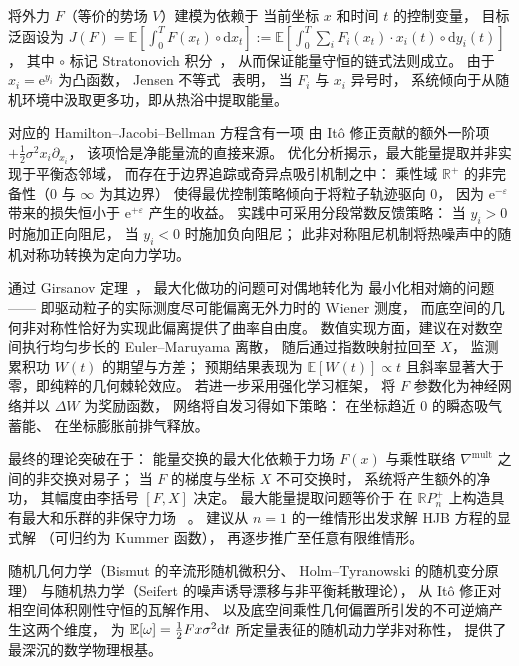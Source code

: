 ﻿\documentclass[10pt,a4paper]{article}
\numberwithin{equation}{section}
\begin{document}
将外力 $F$（等价的势场 $V$）建模为依赖于
当前坐标 $x$ 和时间 $t$ 的控制变量，
目标泛函设为
$J(F) = \mathbb E\left[\int_0^T F(x_t)\circ \mathrm dx_t\right]
:= \mathbb E\left[\int_0^T \sum_i F_i(x_t)\cdot x_i(t)\circ \mathrm dy_i(t)\right]$，
其中 $\circ$ 标记 Stratonovich 积分~\cite{Stratonovich1966New}，
从而保证能量守恒的链式法则成立。
由于 $x_i = \mathrm e^{y_i}$ 为凸函数，
Jensen 不等式~\cite{Jensen1906SurLesFonctions} 表明，
当 $F_i$ 与 $x_i$ 异号时，
系统倾向于从随机环境中汲取更多功，即从热浴中提取能量。

对应的 Hamilton--Jacobi--Bellman 方程含有一项
由 It\^{o} 修正贡献的额外一阶项 $+\frac12\sigma^2 x_i \partial_{x_i}$，
该项恰是净能量流的直接来源。
优化分析揭示，最大能量提取并非实现于平衡态邻域，
而存在于边界追踪或奇异点吸引机制之中：
乘性域 $\mathbb R^+$ 的非完备性（$0$ 与 $\infty$ 为其边界）
使得最优控制策略倾向于将粒子轨迹驱向 $0$，
因为 $\mathrm e^{-\varepsilon}$ 带来的损失恒小于 $\mathrm e^{+\varepsilon}$ 产生的收益。
实践中可采用分段常数反馈策略：
当 $y_i > 0$ 时施加正向阻尼，
当 $y_i < 0$ 时施加负向阻尼；
此非对称阻尼机制将热噪声中的随机对称功转换为定向力学功。

通过 Girsanov 定理~\cite{Bismut1981LargeDeviations}，
最大化做功的问题可对偶地转化为
最小化相对熵的问题——
即驱动粒子的实际测度尽可能偏离无外力时的 Wiener 测度，
而底空间的几何非对称性恰好为实现此偏离提供了曲率自由度。
数值实现方面，建议在对数空间执行均匀步长的 Euler--Maruyama 离散，
随后通过指数映射拉回至 $X$，
监测累积功 $W(t)$ 的期望与方差；
预期结果表现为 $\mathbb E[W(t)] \propto t$ 
且斜率显著大于零，即纯粹的几何棘轮效应。
若进一步采用强化学习框架，
将 $F$ 参数化为神经网络并以 $\Delta W$ 为奖励函数，
网络将自发习得如下策略：
在坐标趋近 $0$ 的瞬态吸气蓄能、
在坐标膨胀前排气释放。

最终的理论突破在于：
能量交换的最大化依赖于力场 $F(x)$
与乘性联络 $\nabla^{\mathrm{mult}}$ 之间的非交换对易子；
当 $F$ 的梯度与坐标 $X$ 不可交换时，
系统将产生额外的净功，
其幅度由李括号 $[F, X]$ 决定。
最大能量提取问题等价于
在 $\mathbb R P^+_n$ 上构造具有最大和乐群的非保守力场
~\cite{KobayashiNomizu1963Foundations}。
建议从 $n=1$ 的一维情形出发求解 HJB 方程的显式解
（可归约为 Kummer 函数），
再逐步推广至任意有限维情形。

随机几何力学（Bismut 的辛流形随机微积分、
Holm--Tyranowski 的随机变分原理）
与随机热力学（Seifert 的噪声诱导漂移与非平衡耗散理论），
从 It\^{o} 修正对相空间体积刚性守恒的瓦解作用、
以及底空间乘性几何偏置所引发的不可逆熵产生这两个维度，
为 $\mathbb E[\omega] = \frac{1}{2}Fx\sigma^2 \text dt$
所定量表征的随机动力学非对称性，
提供了最深沉的数学物理根基。
\end{document}
